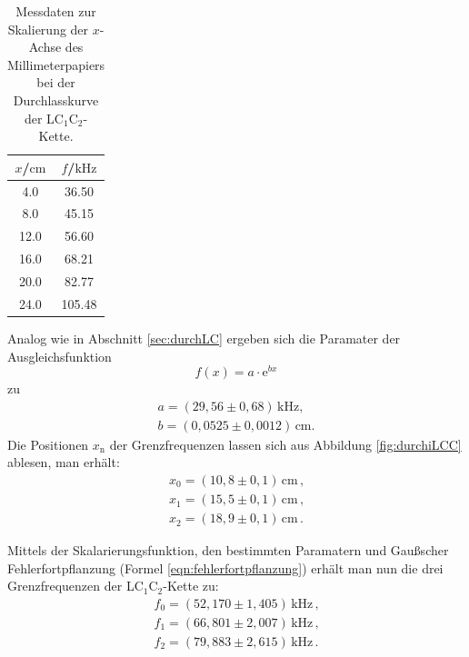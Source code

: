 \begin{table}
	\caption{Messdaten zur Skalierung der $x$-Achse des Millimeterpapiers bei der
	Durchlasskurve der LC$_1$C$_2$-Kette.}
	\label{tab:skalaLCC}
	\centering
	\begin{tabular}{cc}
		\toprule
		$x$/$\si{\centi\meter}$ & $f$/$\si{\kilo\hertz}$ \\
		\midrule
		4.0                     & 36.50                  \\
		8.0                     & 45.15                  \\
		12.0                    & 56.60                  \\
		16.0                    & 68.21                  \\
		20.0                    & 82.77                  \\
		24.0                    & 105.48                 \\
		\bottomrule
	\end{tabular}
\end{table}
Analog wie in Abschnitt \ref{sec:durchLC} ergeben sich die Paramater der Ausgleichsfunktion 
\begin{equation*}
	f(x) = a \cdot \mathrm{e}^{bx}
\end{equation*}
zu
\begin{gather*}
	a = (29,56 \pm 0,68) \, \si{\kilo\hertz} \text{,} \\
	b = (0,0525 \pm 0,0012) \, \si{\centi\meter} \text{.}
\end{gather*}
Die Positionen $x_\text{n}$ der Grenzfrequenzen lassen sich aus Abbildung \ref{fig:durchiLCC} 
ablesen, man erhält:
\begin{gather*}
	x_0 = (10,8 \pm 0,1) \, \si{\centi\meter} \, \text{,} \\ 
	x_1 = (15,5 \pm 0,1) \, \si{\centi\meter} \, \text{,} \\ 
	x_2 = (18,9 \pm 0,1) \, \si{\centi\meter} \, \text{.}
\end{gather*}

Mittels der Skalarierungsfunktion, den bestimmten Paramatern und Gaußscher Fehlerfortpflanzung 
(Formel \eqref{eqn:fehlerfortpflanzung}) erhält man nun die drei Grenzfrequenzen der 
LC$_1$C$_2$-Kette zu:
\begin{gather*}
	f_0 = (52,170 \pm 1,405) \, \si{\kilo\hertz} \, \text{,} \\
	f_1 = (66,801 \pm 2,007) \, \si{\kilo\hertz} \, \text{,} \\
	f_2 = (79,883 \pm 2,615) \, \si{\kilo\hertz} \, \text{.}
\end{gather*}

